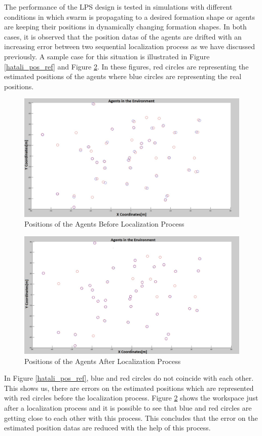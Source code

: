 The performance of the LPS design is tested in simulations with different conditions in which swarm is propagating to a desired formation shape or agents are keeping their positions in dynamically changing formation shapes.  In both cases, it is observed that the position datas of the agents are drifted with an increasing error between two  sequential localization process as we have discussed previously. A sample case for this situation is illustrated in Figure \ref{hatali_pos_ref} and Figure \ref{duzgun_pos_ref}. In these figures, red circles are representing the estimated positions of the agents where blue circles are representing the real positions. 

\begin{figure}[H]
\centering
\captionsetup{format=hang,justification=centerfirst}
\caption{Positions of the Agents Before Localization Process} \label{hatali_pos_ref}
\centerline{
\includegraphics[scale = 0.35]{Pozisyon_1_Hatali}}
\label{fig:lps}
\end{figure}

\begin{figure}[H]
\centering
\captionsetup{format=hang,justification=centerfirst}
\caption{Positions of the Agents After Localization Process} \label{duzgun_pos_ref}
\centerline{\includegraphics[scale = 0.25]{Pozisyon-1-Duzeltilmis}}
\end{figure} 
In Figure \ref{hatali_pos_ref}, blue and red circles do not coincide with each other. This shows us, there are errors on the estimated positions which are represented with red circles before the localization process. Figure \ref{duzgun_pos_ref} shows the workspace just after a localization process and it is possible to see that blue and red circles are getting close to each other with this process. This concludes that the error on the estimated position datas are reduced with the help of this process.
		
